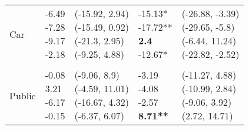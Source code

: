 \documentclass[10pt]{article}
\begin{document}
\begin{table}
\begin{center}
\begin{small}
\begin{tabular}{lllll}
\quad Car    &  \makecell[l]{\textnormal{-6.49\phantom{***}} \\\textnormal{-7.28\phantom{***}} \\\textnormal{-9.17\phantom{***}} \\\textnormal{-2.18\phantom{***}} \\}   &  \makecell[l]{\textnormal{(-15.92, 2.94)} \\\textnormal{(-15.49, 0.92)} \\\textnormal{(-21.3, 2.95)} \\\textnormal{(-9.25, 4.88)} \\}   &  \makecell[l]{\textnormal{-15.13*\phantom{**}} \\\textnormal{-17.72**\phantom{*}} \\\textbf{2.4\phantom{***}} \\\textnormal{-12.67*\phantom{**}} \\}   &  \makecell[l]{\textnormal{(-26.88, -3.39)} \\\textnormal{(-29.65, -5.8)} \\\textnormal{(-6.44, 11.24)} \\\textnormal{(-22.82, -2.52)} \\} \\ 
& & & & \\ 
\quad Public    &  \makecell[l]{\textnormal{-0.08\phantom{***}} \\\textnormal{3.21\phantom{***}} \\\textnormal{-6.17\phantom{***}} \\\textnormal{-0.15\phantom{***}} \\}   &  \makecell[l]{\textnormal{(-9.06, 8.9)} \\\textnormal{(-4.59, 11.01)} \\\textnormal{(-16.67, 4.32)} \\\textnormal{(-6.37, 6.07)} \\}   &  \makecell[l]{\textnormal{-3.19\phantom{***}} \\\textnormal{-4.08\phantom{***}} \\\textnormal{-2.57\phantom{***}} \\\textbf{8.71**\phantom{*}} \\}   &  \makecell[l]{\textnormal{(-11.27, 4.88)} \\\textnormal{(-10.99, 2.84)} \\\textnormal{(-9.06, 3.92)} \\\textnormal{(2.72, 14.71)} \\} \\ 

\end{tabular}
\end{small}
\end{center}
\end{table}
\end{document}
